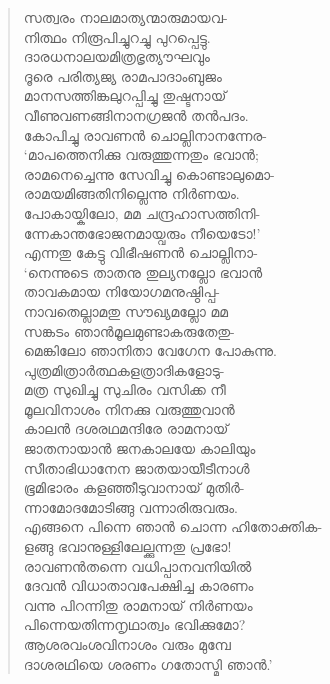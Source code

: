 \begin{verse}
സത്വരം നാലമാത്യന്മാരുമായവ-\\
നിത്ഥം നിരൂപിച്ചുറച്ചു പുറപ്പെട്ടു.\\
ദാരധനാലയമിത്രഭൃത്യൗഘവും\\
ദൂരെ പരിത്യജ്യ രാമപാദാംബുജം\\
മാനസത്തിങ്കലുറപ്പിച്ചു തുഷ്ടനായ്\\
വീണുവണങ്ങിനാനഗ്രജന്‍ തന്‍പദം.\\
കോപിച്ചു രാവണന്‍ ചൊല്ലിനാനന്നേര-\\
‘മാപത്തെനിക്കു വരുത്തുന്നതും ഭവാന്‍;\\
രാമനെച്ചെന്നു സേവിച്ചു കൊണ്ടാലുമൊ-\\
രാമയമിങ്ങതിനില്ലെന്നു നിര്‍ണയം.\\
പോകായ്കിലോ, മമ ചന്ദ്രഹാസത്തിനി-\\
ന്നേകാന്തഭോജനമായ്വരും നീയെടോ!’\\
എന്നതു കേട്ടു വിഭീഷണന്‍ ചൊല്ലിനാ-\\
‘നെന്നുടെ താതനു തുല്യനല്ലോ ഭവാന്‍\\
താവകമായ നിയോഗമനുഷ്ഠിപ്പ-\\
നാവതെല്ലാമതു സൗഖ്യമല്ലോ മമ\\
സങ്കടം ഞാന്‍മൂലമുണ്ടാകരുതേതു-\\
മെങ്കിലോ ഞാനിതാ വേഗേന പോകുന്നു.\\
പുത്രമിത്രാര്‍ത്ഥകളത്രാദികളോടു-\\
മത്ര സുഖിച്ചു സുചിരം വസിക്ക നീ\\
മൂലവിനാശം നിനക്കു വരുത്തുവാന്‍\\
കാലന്‍ ദശരഥമന്ദിരേ രാമനായ്\\
ജാതനായാന്‍ ജനകാലയേ കാലിയും\\
സീതാഭിധാനേന ജാതയായീടീനാള്‍\\
ഭൂമിഭാരം കളഞ്ഞീടുവാനായ് മുതിര്‍-\\
ന്നാമോദമോടിങ്ങു വന്നാരിരുവരും.\\
എങ്ങനെ പിന്നെ ഞാന്‍ ചൊന്ന ഹിതോക്തിക-\\
ളങ്ങു ഭവാനുള്ളിലേല്ക്കുന്നതു പ്രഭോ!\\
രാവണന്‍തന്നെ വധിപ്പാനവനിയില്‍\\
ദേവന്‍ വിധാതാവപേക്ഷിച്ച കാരണം\\
വന്നു പിറന്നിതു രാമനായ് നിര്‍ണയം\\
പിന്നെയതിന്നനൃഥാത്വം ഭവിക്കുമോ?\\
ആശരവംശവിനാശം വരും മുമ്പേ\\
ദാശരഥിയെ ശരണം ഗതോസ്മി ഞാന്‍.’
\end{verse}


